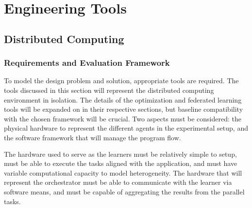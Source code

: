 \documentclass[../mthe-493-final-project.tex]{subfiles}
\begin{document}
    \chapter{Engineering Tools}
    \label{ch:engineering-tools}
    
    \section{Distributed Computing}
    \label{sec:distributed-computing-engineering-tools}
    
    \subsection{Requirements and Evaluation Framework}
    To model the design problem and solution, appropriate tools are required. The tools discussed in this section will represent the distributed computing environment in isolation. The details of the optimization and federated learning tools will be expanded on in their respective sections, but baseline compatibility with the chosen framework will be crucial. Two aspects must be considered: the physical hardware to represent the different agents in the experimental setup, and the software framework that will manage the program flow. 
    
    The hardware used to serve as the learners must be relatively simple to setup, must be able to execute the tasks aligned with the application, and must have variable computational capacity to model heterogeneity. The hardware that will represent the orchestrator must be able to communicate with the learner via software means, and must be capable of aggregating the results from the parallel tasks.
    
\end{document}
